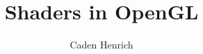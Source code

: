 \documentclass{article}
\title{Shaders in OpenGL}
\author{Caden Henrich}
\begin{document}
\maketitle
\break
\tableofcontents
\break
\end{document}
